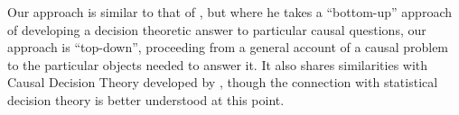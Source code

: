 Our approach is similar to that of \citet{dawid_decision-theoretic_2012}, but where he takes a ``bottom-up'' approach of developing a decision theoretic answer to particular causal questions, our approach is ``top-down'', proceeding from a general account of a causal problem to the particular objects needed to answer it. It also shares similarities with Causal Decision Theory developed by \citet{lewis_causal_1981}, though the connection with statistical decision theory is better understood at this point.




